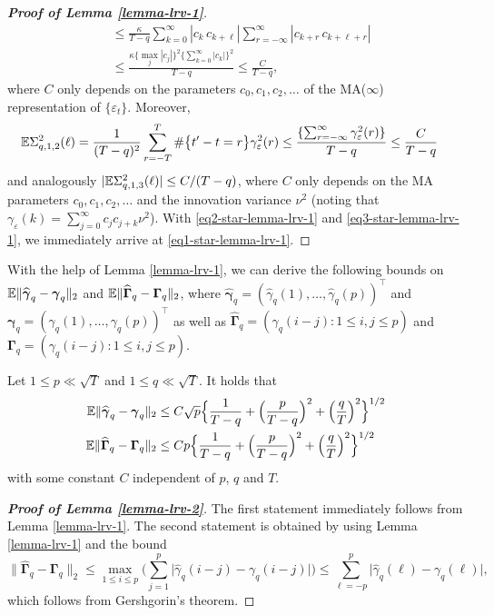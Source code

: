 \begin{proof}[\textnormal{\textbf{Proof of Lemma \ref{lemma-lrv-1}}}]
\begin{align}
 & \le \frac{\kappa}{T-q} \sum_{k=0}^{\infty} | c_k \, c_{k+\ell} | \sum_{r=-\infty}^\infty | c_{k+r} \, c_{k+\ell+r} | \nonumber \\
 & \le \frac{\kappa \{ \max_j|c_j| \}^2 \{ \sum_{k=0}^{\infty} |c_k| \}^2}{T-q}  \le \frac{C}{T-q}, \label{eq2-star-lemma-lrv-1} 
\end{align}
where $C$ only depends on the parameters $c_0,c_1,c_2,\ldots$ of the MA($\infty$) representation of $\{ \varepsilon_t\}$. Moreover, 
\begin{align}
\mathbb{E} \Sigma_{q,1,2}^2(\ell) 
 & = \frac{1}{(T-q)^2} \sum_{r=-T}^T \# \big\{ t^\prime - t = r \big\} \gamma_{\varepsilon}^2(r) \le \frac{\{ \sum_{r=-\infty}^\infty \gamma_{\varepsilon}^2(r) \}}{T-q} \le \frac{C}{T-q} \label{eq3-star-lemma-lrv-1}
\end{align}
and analogously $|\mathbb{E} \Sigma_{q,1,3}^2(\ell)| \le C/(T-q)$, where $C$ only depends on the MA parameters $c_0,c_1,c_2,\ldots$ and the innovation variance $\nu^2$ (noting that $\gamma_\varepsilon(k) = \sum_{j=0}^\infty c_j c_{j+k} \nu^2$). With \eqref{eq2-star-lemma-lrv-1} and \eqref{eq3-star-lemma-lrv-1}, we immediately arrive at \eqref{eq1-star-lemma-lrv-1}. 
\end{proof}


With the help of Lemma \ref{lemma-lrv-1}, we can derive the following bounds on $\mathbb{E} \| \widehat{\boldsymbol{\gamma}}_q - \boldsymbol{\gamma}_q \|_2$ and $\mathbb{E} \| \widehat{\boldsymbol{\Gamma}}_q - \boldsymbol{\Gamma}_q \|_2$, where $\widehat{\boldsymbol{\gamma}}_q = (\widehat{\gamma}_q(1),\dots,\widehat{\gamma}_q(p))^\top$ and $\boldsymbol{\gamma}_q = (\gamma_q(1),\dots,\gamma_q(p))^\top$ as well as $\widehat{\boldsymbol{\Gamma}}_q = (\widehat{\gamma}_q(i-j): 1 \le i,j \le p)$ and $\boldsymbol{\Gamma}_q = (\gamma_q(i-j): 1 \le i,j \le p)$. 
%
%
\begin{lemmaA}\label{lemma-lrv-2}
Let $1 \le p \ll \sqrt{T}$ and $1 \le q \ll \sqrt{T}$. It holds that 
\begin{align*}
\mathbb{E} \| \widehat{\boldsymbol{\gamma}}_q - \boldsymbol{\gamma}_q \|_2 & \le C \sqrt{p} \Big\{ \frac{1}{T-q} + \Big(\frac{p}{T-q}\Big)^2 + \Big(\frac{q}{T}\Big)^2 \Big\}^{1/2} \\
\mathbb{E} \| \widehat{\boldsymbol{\Gamma}}_q - \boldsymbol{\Gamma}_q \|_2 & \le C p \Big\{ \frac{1}{T-q} + \Big(\frac{p}{T-q}\Big)^2 + \Big(\frac{q}{T}\Big)^2 \Big\}^{1/2}
\end{align*}
with some constant $C$ independent of $p$, $q$ and $T$. 
\end{lemmaA}
%
%
\begin{proof}[\textnormal{\textbf{Proof of Lemma \ref{lemma-lrv-2}}}] 
The first statement immediately follows from Lemma \ref{lemma-lrv-1}. The second statement is obtained by using Lemma \ref{lemma-lrv-1} and the bound
\[ \| \widehat{\boldsymbol{\Gamma}}_q - \boldsymbol{\Gamma}_q \|_2 \le \max_{1 \le i \le p} \Big( \sum\limits_{j=1}^p \big| \widehat{\gamma}_q(i-j) - \gamma_q(i-j) \big| \Big) \le \sum\limits_{\ell=-p}^p \big| \widehat{\gamma}_q(\ell) - \gamma_q(\ell) \big|, \]
which follows from Gershgorin's theorem. 
\end{proof}


